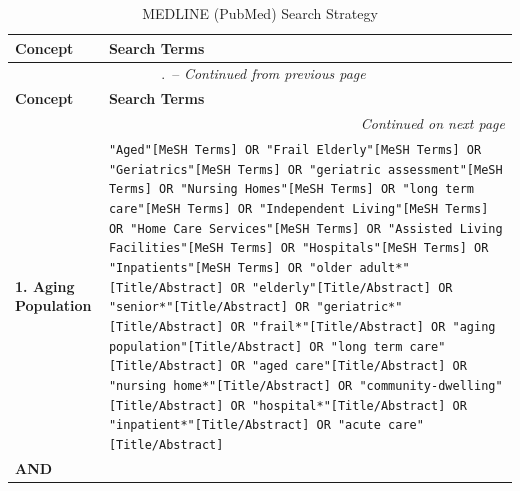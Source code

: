\setcounter{table}{0}
\renewcommand{\thetable}{\thechapter.\arabic{table}}

\begin{longtable}{p{}p{}}
    \caption{MEDLINE (PubMed) Search Strategy} \label{tab:search_strategy_specific}     \\
    \toprule
    \textbf{Concept}             & \textbf{Search Terms}                                \\
    \midrule
    \endfirsthead

    \multicolumn{2}{c}{\tablename\ \thetable\ -- \textit{Continued from previous page}} \\
    \toprule
    \textbf{Concept}             & \textbf{Search Terms}                                \\
    \midrule
    \endhead

    \midrule
    \multicolumn{2}{r}{\textit{Continued on next page}}                                 \\
    \endfoot

    \bottomrule
    \endlastfoot

    \textbf{1. Aging Population} &
    \footnotesize\texttt{"Aged"[MeSH Terms] OR
    "Frail Elderly"[MeSH Terms] OR
    "Geriatrics"[MeSH Terms] OR
    "geriatric assessment"[MeSH Terms] OR
    "Nursing Homes"[MeSH Terms] OR
    "long term care"[MeSH Terms] OR
    "Independent Living"[MeSH Terms] OR
    "Home Care Services"[MeSH Terms] OR
    "Assisted Living Facilities"[MeSH Terms] OR
    "Hospitals"[MeSH Terms] OR
    "Inpatients"[MeSH Terms] OR
    "older adult*"[Title/Abstract] OR
    "elderly"[Title/Abstract] OR
    "senior*"[Title/Abstract] OR
    "geriatric*"[Title/Abstract] OR
    "frail*"[Title/Abstract] OR
    "aging population"[Title/Abstract] OR
    "long term care"[Title/Abstract] OR
    "aged care"[Title/Abstract] OR
    "nursing home*"[Title/Abstract] OR
    "community-dwelling"[Title/Abstract] OR
    "hospital*"[Title/Abstract] OR
    "inpatient*"[Title/Abstract] OR
    "acute care"[Title/Abstract]}                                                       \\
    \addlinespace

    \textbf{AND}                 &
    \\


\end{longtable}
